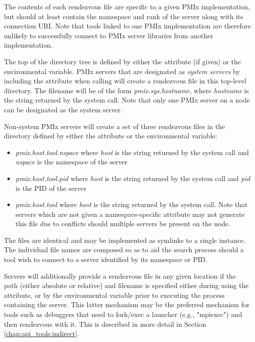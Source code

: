 The contents of each rendezvous file are specific to a given \ac{PMIx} implementation, but should at least contain the namespace and rank of the server along with its connection \ac{URI}. Note that tools linked to one \ac{PMIx} implementation are therefore unlikely to successfully connect to \ac{PMIx} server libraries from another implementation.

The top of the directory tree is defined by either the  attribute (if given) or the  environmental variable. \ac{PMIx} servers that are designated as \emph{system servers} by including the  attribute when calling  will create a rendezvous file in this top-level directory. The filename will be of the form \emph{pmix.sys.hostname}, where \emph{hostname} is the string returned by the  system call. Note that only one \ac{PMIx} server on a node can be designated as the system server.

Non-system \ac{PMIx} servers will create a set of three rendezvous files in the directory defined by either the  attribute or the  environmental variable:

\begin{itemize}
    \item \emph{pmix.host.tool.nspace} where \emph{host} is the string returned by the  system call and \emph{nspace} is the namespace of the server
    \item \emph{pmix.host.tool.pid} where \emph{host} is the string returned by the  system call and \emph{pid} is the \ac{PID} of the server
    \item \emph{pmix.host.tool}  where \emph{host} is the string returned by the  system call. Note that servers which are not given a namespace-specific  attribute may not generate this file due to conflicts should multiple servers be present on the node.
\end{itemize}

The files are identical and may be implemented as symlinks to a single instance. The individual file names are composed so as to aid the search process should a tool wish to connect to a server identified by its namespace or \ac{PID}.

Servers will additionally provide a rendezvous file in any given location if the path (either absolute or relative) and filename is specified either during  using the  attribute, or by the  environmental variable prior to executing the process containing the server. This latter mechanism may be the preferred mechanism for tools such as debuggers that need to fork/exec a launcher (e.g., "mpiexec") and then rendezvous with it. This is described in more detail in Section \ref{chap:api_tools:indirect}.

